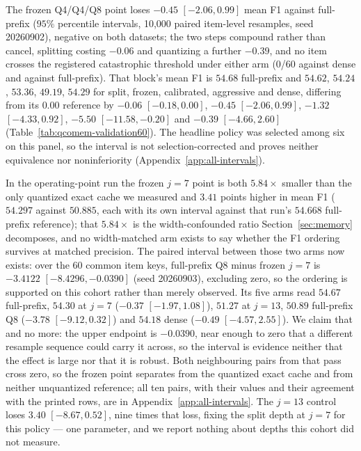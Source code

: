 \documentclass{article}
\begin{document}
The frozen Q4/Q4/Q8 point loses $-0.45$ $[-2.06,0.99]$ mean F1 against
full-prefix ($95\%$ percentile intervals, 10,000 paired item-level resamples,
seed 20260902), negative on both datasets; the two steps compound
rather than cancel, splitting costing $-0.06$
and quantizing a further $-0.39$, and no item crosses the registered
catastrophic threshold under either arm (0/60 against dense and against
full-prefix).  That block's mean F1 is $54.68$ full-prefix and $54.62$,
$54.24$, $53.36$, $49.19$, $54.29$ for split, frozen, calibrated, aggressive and
dense, differing from its $0.00$ reference by
$-0.06$ $[-0.18,0.00]$, $-0.45$ $[-2.06,0.99]$, $-1.32$ $[-4.33,0.92]$, $-5.50$
$[-11.58,-0.20]$ and $-0.39$ $[-4.66,2.60]$
(Table~\ref{tab:qcomem-validation60}).  The headline policy was selected among
six on this panel, so the interval is not selection-corrected and proves neither
equivalence nor noninferiority (Appendix~\ref{app:all-intervals}).

In the operating-point run the frozen $j=7$ point is both $5.84\times$ smaller
than the only quantized exact cache we measured and $3.41$ points higher in mean
F1 ($54.297$ against $50.885$, each with its own interval against that run's
$54.668$ full-prefix reference); that $5.84\times$ is the width-confounded ratio
Section~\ref{sec:memory} decomposes, and no width-matched arm exists to say
whether the F1 ordering survives at matched precision.  The paired interval
between those two arms now exists: over the 60 common item keys, full-prefix Q8
minus frozen $j=7$ is $-3.4122$ $[-8.4296,-0.0390]$ (seed 20260903), excluding
zero, so the ordering is supported on this cohort rather than merely observed.
Its five arms read $54.67$ full-prefix, $54.30$ at $j=7$ ($-0.37$
$[-1.97,1.08]$), $51.27$ at $j=13$, $50.89$ full-prefix Q8 ($-3.78$
$[-9.12,0.32]$) and $54.18$ dense ($-0.49$ $[-4.57,2.55]$).
We claim that and no more: the upper endpoint is $-0.0390$, near enough to zero
that a different resample sequence could carry it across, so the interval is
evidence neither that the effect is large nor that it is robust.  Both
neighbouring pairs from that pass cross zero, so the frozen point separates from
the quantized exact cache and from neither unquantized reference; all ten pairs,
with their values and their agreement with the printed rows, are in
Appendix~\ref{app:all-intervals}.  The $j=13$ control loses $3.40$
$[-8.67,0.52]$, nine times that loss, fixing the split depth at $j=7$ for this
policy --- one parameter, and we report nothing about depths this cohort did
not measure.
\end{document}
